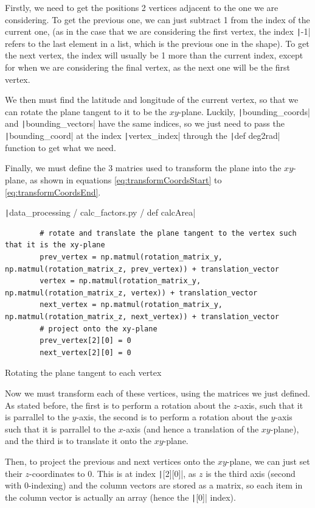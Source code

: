 \documentclass[12pt]{report}
\newcommand{\pil}[1]{\protect\texttt|#1|}
\begin{document}
Firstly, we need to get the positions 2 vertices adjacent to the one we are considering. To get the previous one, we can just subtract 1 from the index of the current one, (as in the case that we are considering the first vertex, the index \pil{-1} refers to the last element in a list, which is the previous one in the shape). To get the next vertex, the index will usually be 1 more than the current index, except for when we are considering the final vertex, as the next one will be the first vertex.

We then must find the latitude and longitude of the current vertex, so that we can rotate the plane tangent to it to be the $xy$-plane. Luckily, \pil{bounding_coords} and \pil{bounding_vectors} have the same indices, so we just need to pass the \pil{bounding_coord} at the index \pil{vertex_index} through the \pil{def deg2rad} function to get what we need.

Finally, we must define the 3 matries used to transform the plane into the $xy$-plane, as shown in equations \ref{eq:transformCoordsStart} to \ref{eq:transformCoordsEnd}.

\begin{listing}[H]
\pil{data_processing / calc_factors.py / def calcArea}
\begin{verbatim}
        # rotate and translate the plane tangent to the vertex such that it is the xy-plane
        prev_vertex = np.matmul(rotation_matrix_y, np.matmul(rotation_matrix_z, prev_vertex)) + translation_vector
        vertex = np.matmul(rotation_matrix_y, np.matmul(rotation_matrix_z, vertex)) + translation_vector
        next_vertex = np.matmul(rotation_matrix_y, np.matmul(rotation_matrix_z, next_vertex)) + translation_vector
        # project onto the xy-plane
        prev_vertex[2][0] = 0
        next_vertex[2][0] = 0
\end{verbatim}
\caption{Rotating the plane tangent to each vertex}\label{cs:dofxRotations}
\end{listing}

Now we must transform each of these vertices, using the matrices we just defined. As stated before, the first is to perform a rotation about the $z$-axis, such that it is parrallel to the $y$-axis, the second is to perform a rotation about the $y$-axis such that it is parrallel to the $x$-axis (and hence a translation of the $xy$-plane), and the third is to translate it onto the $xy$-plane.

Then, to project the previous and next vertices onto the $xy$-plane, we can just set their $z$-coordinates to 0. This is at index \pil{[2][0]}, as $z$ is the third axis (second with 0-indexing) and the column vectors are stored as a matrix, so each item in the column vector is actually an array (hence the \pil{[0]} index).
\end{document}
